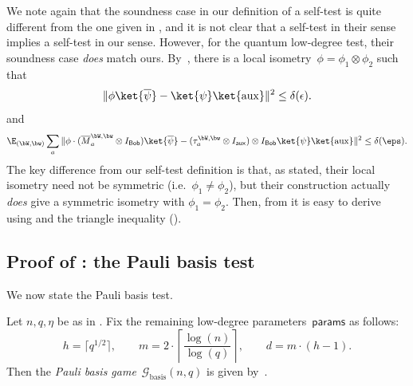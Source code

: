 \documentclass[11pt]{article}
\newcommand{\params}{\mathsf{params}}
\newcommand{\game}{\mathscr{G}}
\newcommand{\reg}[1]{{\mathsf{#1}}}
\begin{document}
\begin{remark}
We note again that the soundness case in our definition of a self-test is quite different from the one given in \cite[Definition~$2.5$]{NV18a},
and it is not clear that a self-test in their sense implies a self-test in our sense.
However, for the quantum low-degree test, their soundness case \emph{does} match ours.
By~\cite[Lemma~$4.1$]{NV18a}, there is a local isometry~$\phi = \phi_1 \otimes \phi_2$ such that
\begin{equation}\label{eq:anand-testing-state}
\Vert \phi \ket{\overline{\psi}} - \ket{\psi}\ket{\mathrm{aux}} \Vert^2 \leq \delta(\epsilon).
\end{equation}
and
\begin{equation}\label{eq:anand-testing-state}
\E_{(\bW, \bw)} \sum_a \Vert \phi \cdot (\overline{M}^{\bW, \bw}_{a} \otimes I_{\reg{Bob}}) \ket{\overline{\psi}}
	 - (\tau_{a}^{\bW, \bw} \otimes I_{\reg{aux}})  \otimes I_{\reg{Bob}} \ket{\psi} \ket{\mathrm{aux}} \Vert^2
\leq \delta(\eps).
\end{equation}
The key difference from our self-test definition is that, as stated, their local isometry need not be symmetric (i.e.\ $\phi_1 \neq \phi_2$),
but their construction actually \emph{does} give a symmetric isometry with $\phi_1 = \phi_2$.
Then, from  it is easy to derive  using  and the triangle inequality ().
\end{remark}

\subsection{Proof of : the Pauli basis test}

We now state the Pauli basis test.

\begin{definition}
Let $n,q,\eta$ be as in .
Fix the remaining low-degree parameters~$\params$ as follows:
\begin{equation*}
h = \lceil q^{1/2}\rceil, \qquad m = 2\cdot \left\lceil \frac{\log(n)}{\log(q)}\right\rceil,
\qquad d = m \cdot (h-1).
\end{equation*}
Then the \emph{Pauli basis game}~$\game_{\mathrm{basis}}(n,q)$ is given by~.
\end{definition}
\end{document}
